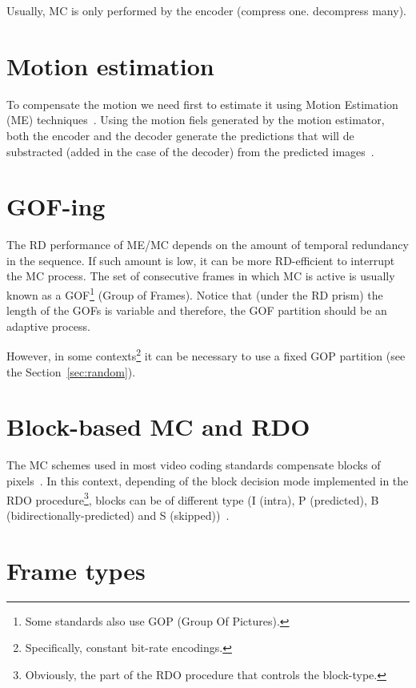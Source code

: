 Usually, MC is only performed by the encoder (compress one. decompress
many).


\section{Motion estimation}

To compensate the motion we need first to estimate it using Motion
Estimation (ME) techniques~\cite{vruiz__ME}. Using the motion fiels
generated by the motion estimator, both the encoder and the decoder
generate the predictions that will de substracted (added in the case
of the decoder) from the predicted images~\cite{vruiz__MC}.


\section{GOF-ing}

The RD performance of ME/MC depends on the amount of temporal
redundancy in the sequence. If such amount is low, it can be more
RD-efficient to interrupt the MC process. The set of consecutive
frames in which MC is active is usually known as a GOF\footnote{Some
  standards also use GOP (Group Of Pictures).} (Group of
Frames). Notice that (under the RD prism) the length of the GOFs is
variable and therefore, the GOF partition should be an adaptive
process.

However, in some contexts\footnote{Specifically, constant bit-rate
  encodings.} it can be necessary to use a fixed GOP partition (see
the Section~\ref{sec:random}).

\section{Block-based MC and RDO}

The MC schemes used in most video coding standards compensate blocks
of pixels~\cite{vruiz__ME}. In this context, depending of the block
decision mode implemented in the RDO procedure\footnote{Obviously, the
  part of the RDO procedure that controls the block-type.}, blocks can
be of different type (I (intra), P (predicted), B
(bidirectionally-predicted) and S (skipped))~\cite{vruiz__MC}.

\section{Frame types}

